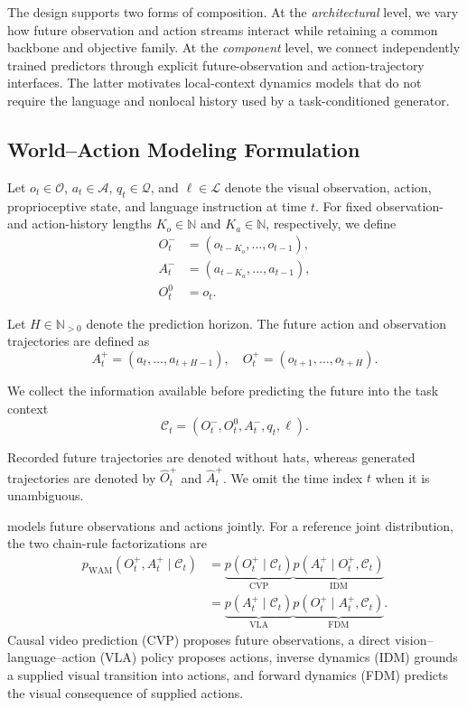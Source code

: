 The design supports two forms of composition. At the \emph{architectural}
level, we vary how future observation and action streams interact while
retaining a common backbone and objective family. At the
\emph{component} level, we connect independently trained predictors through
explicit future-observation and action-trajectory interfaces. The latter
motivates local-context dynamics models that do not require the language and
nonlocal history used by a task-conditioned generator.

\subsection{World--Action Modeling Formulation}
\label{sec:world-action-interfaces}

Let \(o_t \in \mathcal{O}\), \(a_t \in \mathcal{A}\), \(q_t \in \mathcal{Q}\), and \(\ell\in\mathcal{L}\) denote the visual observation, action, proprioceptive state, and language instruction at time $t$. For fixed observation- and action-history lengths \(K_o\in\mathbb{N}\) and \(K_a\in\mathbb{N}\), respectively, we define
\begin{equation}
\begin{aligned}
O_t^- &= (o_{t-K_o}, \ldots, o_{t-1}), \\
A_t^- &= (a_{t-K_a}, \ldots, a_{t-1}), \\
O_t^0 &= o_t.
\end{aligned}
\end{equation}

Let \(H\in\mathbb N_{>0}\) denote the prediction horizon. The future action and observation trajectories are defined as
\begin{equation}
A_t^+ = (a_t, \ldots, a_{t+H-1}), \quad O_t^+ = (o_{t+1}, \ldots, o_{t+H}).
\end{equation}

We collect the information available before predicting the future into the task context
\[
\mathcal C_t=(O_t^-,O_t^0,A_t^-,q_t,\ell).
\]

Recorded future trajectories are denoted without hats, whereas generated trajectories are denoted by \(\hat O_t^+\) and \(\hat A_t^+\). We omit the time index \(t\) when it is unambiguous.

\ours models future observations and actions jointly. For a reference
joint distribution, the two chain-rule factorizations are
\begin{equation}
\begin{aligned}
p_{\mathrm{WAM}}
( O_t^+, A_t^+\mid\mathcal C_t)
&=
\underbrace{p( O_t^+\mid\mathcal C_t)}_{\mathrm{CVP}}
\underbrace{
p( A_t^+\mid O_t^+,\mathcal C_t)
}_{\mathrm{IDM}}\\
&=
\underbrace{p( A_t^+\mid\mathcal C_t)}_{\mathrm{VLA}}
\underbrace{
p( O_t^+\mid A_t^+,\mathcal C_t)
}_{\mathrm{FDM}}.
\end{aligned}
\label{eq:wam-factorizations}
\end{equation}
Causal video prediction (CVP) proposes future observations, a direct
vision--language--action (VLA) policy proposes actions, inverse dynamics
(IDM) grounds a supplied visual transition into actions, and forward
dynamics (FDM) predicts the visual consequence of supplied actions.

